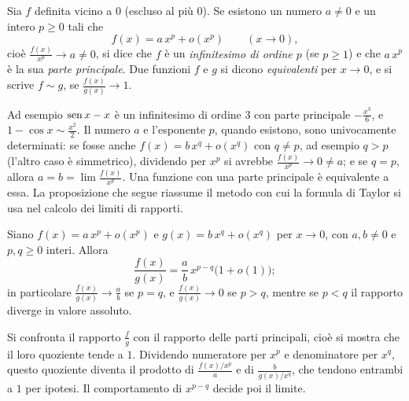 \begin{definizione}
\label{def:parte-principale}
Sia $f$ definita vicino a $0$ (escluso al più $0$). Se esistono un numero $a\neq0$ e un
intero $p\ge0$ tali che
\[
  f(x)=a\,x^{p}+o(x^{p}) \qquad (x\to0),
\]
cioè $\frac{f(x)}{x^{p}}\to a\neq0$, si dice che $f$ è un \emph{infinitesimo di ordine $p$} (se $p\ge1$)
e che $a\,x^{p}$ è la sua \emph{parte principale}. Due funzioni $f$ e $g$ si dicono
\emph{equivalenti} per $x\to0$, e si scrive $f\sim g$, se $\frac{f(x)}{g(x)}\to1$.
\end{definizione}

Ad esempio $\operatorname{sen} x-x$ è un infinitesimo di ordine $3$ con parte principale $-\frac{x^{3}}6$, e
$1-\cos x\sim\frac{x^{2}}2$. Il numero $a$ e l'esponente $p$, quando esistono, sono univocamente
determinati: se fosse anche $f(x)=b\,x^{q}+o(x^{q})$ con $q\neq p$, ad esempio $q>p$ (l'altro
caso è simmetrico), dividendo per $x^{p}$ si avrebbe $\frac{f(x)}{x^{p}}\to0\neq a$; e se $q=p$,
allora $a=b=\lim\frac{f(x)}{x^{p}}$. Una funzione con una parte
principale è equivalente a essa. La proposizione che segue riassume il metodo con cui la
formula di Taylor si usa nel calcolo dei limiti di rapporti.

\begin{proposizione}\label{prop:parte-principale}
Siano $f(x)=a\,x^{p}+o(x^{p})$ e $g(x)=b\,x^{q}+o(x^{q})$ per $x\to0$, con $a,b\neq0$ e
$p,q\ge0$ interi. Allora
\begin{equation}\label{eq:parte-principale}
  \frac{f(x)}{g(x)}=\frac ab\,x^{p-q}\bigl(1+o(1)\bigr) ;
\end{equation}
in particolare $\frac{f(x)}{g(x)}\to\frac ab$ se $p=q$, e $\frac{f(x)}{g(x)}\to0$ se $p>q$, mentre se $p<q$ il
rapporto diverge in valore assoluto.
\end{proposizione}

\begin{schema}
\end{schema}

\begin{strategia}
Si confronta il rapporto $\frac fg$ con il rapporto delle parti principali, cioè si mostra
che il loro quoziente tende a $1$. Dividendo numeratore per $x^{p}$ e denominatore per
$x^{q}$, questo quoziente diventa il prodotto di $\frac{f(x)/x^{p}}{a}$ e di
$\frac{b}{g(x)/x^{q}}$, che tendono entrambi a $1$ per ipotesi. Il comportamento di $x^{p-q}$
decide poi il limite.
\end{strategia}

